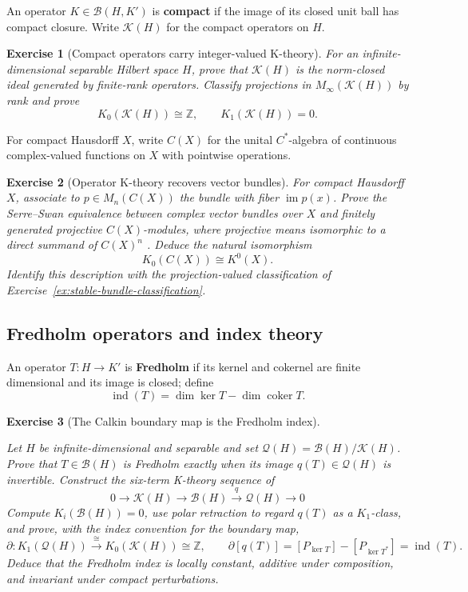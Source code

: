 \documentclass{article}
\newtheorem{exercise}{Exercise}
\begin{document}
An operator $K\in\mathcal B(H,K')$ is \textbf{compact} if the image of its
closed unit ball has compact closure. Write $\mathcal K(H)$ for the compact
operators on $H$.

\begin{exercise}[Compact operators carry integer-valued K-theory]
\leavevmode\par
\textit{For an infinite-dimensional separable Hilbert space $H$, prove that
$\mathcal K(H)$ is the norm-closed ideal generated by finite-rank operators.
Classify projections in $M_\infty(\mathcal K(H))$ by rank and prove}
\[
K_0(\mathcal K(H))\cong\mathbb Z,
\qquad
K_1(\mathcal K(H))=0.
\]
\end{exercise}

For compact Hausdorff $X$, write $C(X)$ for the unital $C^*$-algebra of
continuous complex-valued functions on $X$ with pointwise operations.

\begin{exercise}[Operator K-theory recovers vector bundles]
\leavevmode\par
\textit{For compact Hausdorff $X$, associate to
$p\in M_n(C(X))$ the bundle with fiber $\operatorname{im}p(x)$. Prove the
Serre--Swan equivalence between complex vector bundles over $X$ and finitely
generated projective $C(X)$-modules, where projective means isomorphic to a
direct summand of $C(X)^n$ \cite{swan-vector-bundles}. Deduce the natural
isomorphism}
\[
K_0(C(X))\cong K^0(X).
\]
\textit{Identify this description with the projection-valued classification
of Exercise~\ref{ex:stable-bundle-classification}.}
\end{exercise}

\subsection{Fredholm operators and index theory}

An operator $T:H\to K'$ is \textbf{Fredholm} if its kernel and cokernel are
finite dimensional and its image is closed; define
\[
\operatorname{ind}(T)=\dim\ker T-\dim\operatorname{coker}T.
\]

\begin{exercise}[The Calkin boundary map is the Fredholm index]
\label{ex:calkin-index}
\leavevmode\par
\textit{Let $H$ be infinite-dimensional and separable and set
$\mathcal Q(H)=\mathcal B(H)/\mathcal K(H)$. Prove that $T\in\mathcal B(H)$
is Fredholm exactly when its image $q(T)\in\mathcal Q(H)$ is invertible.
Construct the six-term K-theory sequence of}
\cite{blackadar-k-theory}
\[
0\longrightarrow\mathcal K(H)
\longrightarrow\mathcal B(H)
\xrightarrow{q}\mathcal Q(H)
\longrightarrow0
\]
\textit{Compute $K_i(\mathcal B(H))=0$, use polar retraction to regard
$q(T)$ as a $K_1$-class, and prove, with the index convention for the
boundary map,}
\[
\partial:K_1(\mathcal Q(H))
\xrightarrow{\ \cong\ }K_0(\mathcal K(H))\cong\mathbb Z,
\qquad
\partial[q(T)]
=[P_{\ker T}]-[P_{\ker T^*}]
=\operatorname{ind}(T).
\]
\textit{Deduce that the Fredholm index is locally constant, additive under
composition, and invariant under compact perturbations.}
\end{exercise}
\end{document}
